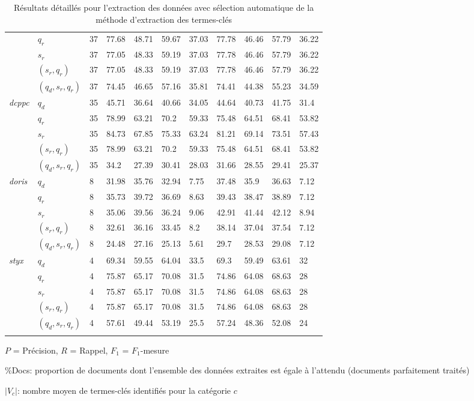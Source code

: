 \begin{table}[!htb]
\begin{center}
\begin{tabular}{l|l|l|llll|llll}
		& $q_r$ & 37 & 77.68 & 48.71 & 59.67 & 37.03 & 77.78 & 46.46 & 57.79 & 36.22 \\
		& $s_r$ & 37 & 77.05 & 48.33 & 59.19 & 37.03 & 77.78 & 46.46 & 57.79 & 36.22 \\
		& $(s_r, q_r)$ & 37 & 77.05 & 48.33 & 59.19 & 37.03 & 77.78 & 46.46 & 57.79 & 36.22 \\
		& $(q_d,s_r, q_r)$ & 37 & 74.45 & 46.65 & 57.16 & 35.81 & 74.41 & 44.38 & 55.23 & 34.59 \\ \hline
		\multirow{5}{*}{\textit{dcppc}} & $q_d$ & 35 & 45.71 & 36.64 & 40.66 & 34.05 & 44.64 & 40.73 & 41.75 & 31.4 \\
		& $q_r$ & 35 & 78.99 & 63.21 & 70.2 & 59.33 & 75.48 & 64.51 & 68.41 & 53.82 \\
		& $s_r$ & 35 & 84.73 & 67.85 & 75.33 & 63.24 & 81.21 & 69.14 & 73.51 & 57.43 \\
		& $(s_r, q_r)$ & 35 & 78.99 & 63.21 & 70.2 & 59.33 & 75.48 & 64.51 & 68.41 & 53.82 \\
		& $(q_d,s_r, q_r)$ & 35 & 34.2 & 27.39 & 30.41 & 28.03 & 31.66 & 28.55 & 29.41 & 25.37 \\ \hline
		\multirow{5}{*}{\textit{doris}} & $q_d$ & 8 & 31.98 & 35.76 & 32.94 & 7.75 & 37.48 & 35.9 & 36.63 & 7.12 \\
		& $q_r$ & 8 & 35.73 & 39.72 & 36.69 & 8.63 & 39.43 & 38.47 & 38.89 & 7.12 \\
		& $s_r$ & 8 & 35.06 & 39.56 & 36.24 & 9.06 & 42.91 & 41.44 & 42.12 & 8.94 \\
		& $(s_r, q_r)$ & 8 & 32.61 & 36.16 & 33.45 & 8.2 & 38.14 & 37.04 & 37.54 & 7.12 \\
		& $(q_d,s_r, q_r)$ & 8 & 24.48 & 27.16 & 25.13 & 5.61 & 29.7 & 28.53 & 29.08 & 7.12 \\ \hline
		\multirow{5}{*}{\textit{styx}} & $q_d$ & 4 & 69.34 & 59.55 & 64.04 & 33.5 & 69.3 & 59.49 & 63.61 & 32 \\
		& $q_r$ & 4 & 75.87 & 65.17 & 70.08 & 31.5 & 74.86 & 64.08 & 68.63 & 28 \\
		& $s_r$ & 4 & 75.87 & 65.17 & 70.08 & 31.5 & 74.86 & 64.08 & 68.63 & 28 \\
		& $(s_r, q_r)$ & 4 & 75.87 & 65.17 & 70.08 & 31.5 & 74.86 & 64.08 & 68.63 & 28 \\
		& $(q_d,s_r, q_r)$ & 4 & 57.61 & 49.44 & 53.19 & 25.5 & 57.24 & 48.36 & 52.08 & 24 \\
			\hline\noalign{\smallskip}
	\end{tabular}
\end{center}

$P$ = Précision, $R$ = Rappel, $F_1$ = $F_1$-mesure
	
\%Docs: proportion de documents dont l'ensemble des données extraites est égale à l'attendu (documents parfaitement traités)

$\vert V_c \vert$: nombre moyen de termes-clés identifiés pour la catégorie $c$
\caption{Résultats détaillés pour l'extraction des données avec sélection automatique de la méthode d'extraction des termes-clés} \label{tab:quanta:resultDetailExtraction}
\end{table}


